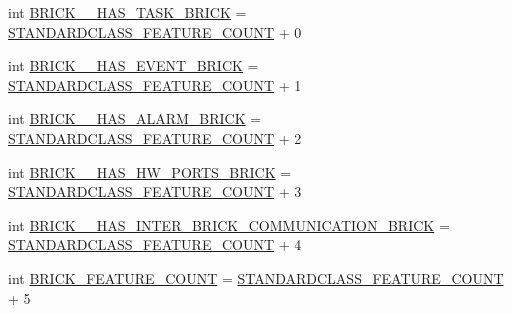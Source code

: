 \begin{DoxyCompactItemize}
\item 
int \hyperlink{interfaceshootingmachineemfmodel_1_1_shootingmachineemfmodel_package_a66883613c7e0d6c9ec3a7249b53ed40f}{B\-R\-I\-C\-K\-\_\-\-\_\-\-H\-A\-S\-\_\-\-T\-A\-S\-K\-\_\-\-B\-R\-I\-C\-K} = \hyperlink{interfaceshootingmachineemfmodel_1_1_shootingmachineemfmodel_package_a14037f66989b3107e402142df96ee9aa}{S\-T\-A\-N\-D\-A\-R\-D\-C\-L\-A\-S\-S\-\_\-\-F\-E\-A\-T\-U\-R\-E\-\_\-\-C\-O\-U\-N\-T} + 0
\item 
int \hyperlink{interfaceshootingmachineemfmodel_1_1_shootingmachineemfmodel_package_a3ca25fb82ba83cfac1da41d268bd1847}{B\-R\-I\-C\-K\-\_\-\-\_\-\-H\-A\-S\-\_\-\-E\-V\-E\-N\-T\-\_\-\-B\-R\-I\-C\-K} = \hyperlink{interfaceshootingmachineemfmodel_1_1_shootingmachineemfmodel_package_a14037f66989b3107e402142df96ee9aa}{S\-T\-A\-N\-D\-A\-R\-D\-C\-L\-A\-S\-S\-\_\-\-F\-E\-A\-T\-U\-R\-E\-\_\-\-C\-O\-U\-N\-T} + 1
\item 
int \hyperlink{interfaceshootingmachineemfmodel_1_1_shootingmachineemfmodel_package_a13634cc753a61b2654bba945425c6a2a}{B\-R\-I\-C\-K\-\_\-\-\_\-\-H\-A\-S\-\_\-\-A\-L\-A\-R\-M\-\_\-\-B\-R\-I\-C\-K} = \hyperlink{interfaceshootingmachineemfmodel_1_1_shootingmachineemfmodel_package_a14037f66989b3107e402142df96ee9aa}{S\-T\-A\-N\-D\-A\-R\-D\-C\-L\-A\-S\-S\-\_\-\-F\-E\-A\-T\-U\-R\-E\-\_\-\-C\-O\-U\-N\-T} + 2
\item 
int \hyperlink{interfaceshootingmachineemfmodel_1_1_shootingmachineemfmodel_package_a28d1fb8532da1a292139a225edce3919}{B\-R\-I\-C\-K\-\_\-\-\_\-\-H\-A\-S\-\_\-\-H\-W\-\_\-\-P\-O\-R\-T\-S\-\_\-\-B\-R\-I\-C\-K} = \hyperlink{interfaceshootingmachineemfmodel_1_1_shootingmachineemfmodel_package_a14037f66989b3107e402142df96ee9aa}{S\-T\-A\-N\-D\-A\-R\-D\-C\-L\-A\-S\-S\-\_\-\-F\-E\-A\-T\-U\-R\-E\-\_\-\-C\-O\-U\-N\-T} + 3
\item 
int \hyperlink{interfaceshootingmachineemfmodel_1_1_shootingmachineemfmodel_package_a9c185c5493c45234bdfeddc820bc7d11}{B\-R\-I\-C\-K\-\_\-\-\_\-\-H\-A\-S\-\_\-\-I\-N\-T\-E\-R\-\_\-\-B\-R\-I\-C\-K\-\_\-\-C\-O\-M\-M\-U\-N\-I\-C\-A\-T\-I\-O\-N\-\_\-\-B\-R\-I\-C\-K} = \hyperlink{interfaceshootingmachineemfmodel_1_1_shootingmachineemfmodel_package_a14037f66989b3107e402142df96ee9aa}{S\-T\-A\-N\-D\-A\-R\-D\-C\-L\-A\-S\-S\-\_\-\-F\-E\-A\-T\-U\-R\-E\-\_\-\-C\-O\-U\-N\-T} + 4
\item 
int \hyperlink{interfaceshootingmachineemfmodel_1_1_shootingmachineemfmodel_package_aa6135c0087ddefa4bda2cd529937b4bf}{B\-R\-I\-C\-K\-\_\-\-F\-E\-A\-T\-U\-R\-E\-\_\-\-C\-O\-U\-N\-T} = \hyperlink{interfaceshootingmachineemfmodel_1_1_shootingmachineemfmodel_package_a14037f66989b3107e402142df96ee9aa}{S\-T\-A\-N\-D\-A\-R\-D\-C\-L\-A\-S\-S\-\_\-\-F\-E\-A\-T\-U\-R\-E\-\_\-\-C\-O\-U\-N\-T} + 5

\end{DoxyCompactItemize}
